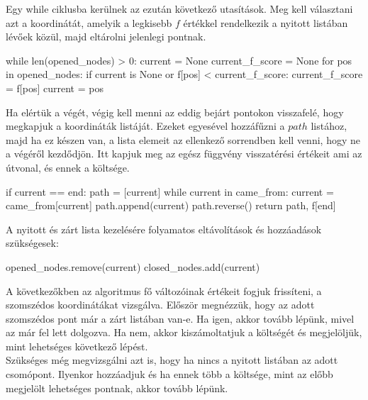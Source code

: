 \bigskip

Egy while ciklusba kerülnek az ezután következő utasítások. Meg kell választani azt a koordinátát, amelyik a legkisebb $ f $ értékkel rendelkezik a nyitott listában lévőek közül, majd eltárolni jelenlegi pontnak. 
\begin{python}
	while len(opened_nodes) > 0:
        current = None
        current_f_score = None
        for pos in opened_nodes:
            if current is None or f[pos] < current_f_score:
                current_f_score = f[pos]
                current = pos

\end{python}

\bigskip

Ha elértük a végét, végig kell menni az eddig bejárt pontokon visszafelé, hogy megkapjuk a koordináták listáját. Ezeket egyesével hozzáfűzni a $ path $ listához, majd ha ez készen van, a lista elemeit az ellenkező sorrendben kell venni, hogy ne a végéről kezdődjön. Itt kapjuk meg az egész függvény visszatérési értékeit ami az útvonal, és ennek a költsége.
\begin{python}
	if current == end:
            path = [current]
            while current in came_from:
                current = came_from[current]
                path.append(current)
            path.reverse()
            return path, f[end]
\end{python}

\bigskip

A nyitott és zárt lista kezelésére folyamatos eltávolítások és hozzáadások szükségesek:

\begin{python}
	opened_nodes.remove(current)
        closed_nodes.add(current)
\end{python}

\bigskip

A következőkben az algoritmus fő változóinak értékeit fogjuk frissíteni, a szomszédos koordinátákat vizsgálva. Először megnézzük, hogy az adott szomszédos pont már a zárt listában van-e. Ha igen, akkor tovább lépünk, mivel az már fel lett dolgozva. Ha nem, akkor kiszámoltatjuk a költségét és megjelöljük, mint lehetséges következő lépést.\\

Szükséges még megvizsgálni azt is, hogy ha nincs a nyitott listában az adott csomópont. Ilyenkor hozzáadjuk és ha ennek több a költsége, mint az előbb megjelölt lehetséges pontnak, akkor tovább lépünk.\\

